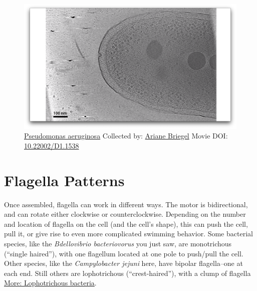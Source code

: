 \documentclass[]{tufte-book}
\begin{document}
\begin{figure}
\includegraphics{movie_stills/6_3a} \caption[\protect\hyperlink{tree}{Pseudomonas aeruginosa} Collected
by: \protect\hyperlink{ariane_briegel}{Ariane Briegel} Movie DOI:
\href{https://doi.org/10.22002/D1.1538}{10.22002/D1.1538}]{\protect\hyperlink{tree}{Pseudomonas aeruginosa} Collected
by: \protect\hyperlink{ariane_briegel}{Ariane Briegel} Movie DOI:
\href{https://doi.org/10.22002/D1.1538}{10.22002/D1.1538}}\label{fig:6-3a}
\end{figure}

\section{Flagella Patterns}\label{flagella-patterns}

Once assembled, flagella can work in different ways. The motor is
bidirectional, and can rotate either clockwise or counterclockwise.
Depending on the number and location of flagella on the cell (and the
cell's shape), this can push the cell, pull it, or give rise to even
more complicated swimming behavior. Some bacterial species, like the
\emph{Bdellovibrio bacteriovorus} you just saw, are monotrichous
(``single haired''), with one flagellum located at one pole to push/pull
the cell. Other species, like the \emph{Campylobacter jejuni} here, have
bipolar flagella--one at each end. Still others are lophotrichous
(``crest-haired''), with a clump of flagella
\protect\hyperlink{Lophotrichous_bacteria}{More: Lophotrichous
bacteria}.
\end{document}
